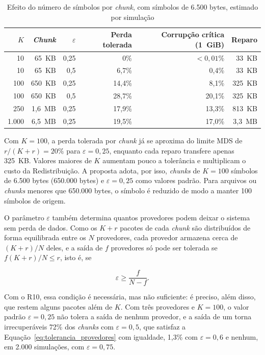 \begin{table}[htbp]
	\centering
	\caption{Efeito do número de símbolos por \emph{chunk}, com símbolos de 6.500 bytes, estimado por simulação}
	\label{tab:tamanho_chunk}
	\begin{tabular}{rrrrrr}
		\hline
		\textbf{$K$} & \textbf{\emph{Chunk}} & \textbf{$\varepsilon$} & \textbf{Perda tolerada} & \textbf{Corrupção crítica (1~GiB)} & \textbf{Reparo} \\
		\hline
		10 & 65~KB & 0,25 & 0\% & $< 0{,}01\%$ & 33~KB \\
		10 & 65~KB & 0,5 & 6,7\% & 0,4\% & 33~KB \\
		100 & 650~KB & 0,25 & 14,4\% & 8,1\% & 325~KB \\
		100 & 650~KB & 0,5 & 28,7\% & 20,1\% & 325~KB \\
		250 & 1,6~MB & 0,25 & 17,9\% & 13,3\% & 813~KB \\
		1.000 & 6,5~MB & 0,25 & 19,5\% & 17,0\% & 3,3~MB \\
		\hline
	\end{tabular}
\end{table}

Com $K = 100$, a perda tolerada por \emph{chunk} já se aproxima do limite MDS de $r/(K + r) = 20\%$ para $\varepsilon = 0{,}25$, enquanto cada reparo transfere apenas 325~KB. Valores maiores de $K$ aumentam pouco a tolerância e multiplicam o custo da Redistribuição. A proposta adota, por isso, \emph{chunks} de $K = 100$ símbolos de 6.500 bytes (650.000 bytes) e $\varepsilon = 0{,}25$ como valores padrão. Para arquivos ou \emph{chunks} menores que 650.000 bytes, o símbolo é reduzido de modo a manter 100 símbolos de origem.

O parâmetro $\varepsilon$ também determina quantos provedores podem deixar o sistema sem perda de dados. Como os $K + r$ pacotes de cada \emph{chunk} são distribuídos de forma equilibrada entre os $N$ provedores, cada provedor armazena cerca de $(K + r)/N$ deles, e a saída de $f$ provedores só pode ser tolerada se $f (K + r)/N \le r$, isto é, se

\begin{equation}
	\varepsilon \ge \frac{f}{N - f}.
	\label{eq:tolerancia_provedores}
\end{equation}

\noindent Com o R10, essa condição é necessária, mas não suficiente: é preciso, além disso, que restem alguns pacotes além de $K$. Com três provedores e $K = 100$, o valor padrão $\varepsilon = 0{,}25$ não tolera a saída de nenhum provedor, e a saída de um torna irrecuperáveis 72\% dos \emph{chunks} com $\varepsilon = 0{,}5$, que satisfaz a Equação~\eqref{eq:tolerancia_provedores} com igualdade, 1,3\% com $\varepsilon = 0{,}6$ e nenhum, em 2.000 simulações, com $\varepsilon = 0{,}75$.

